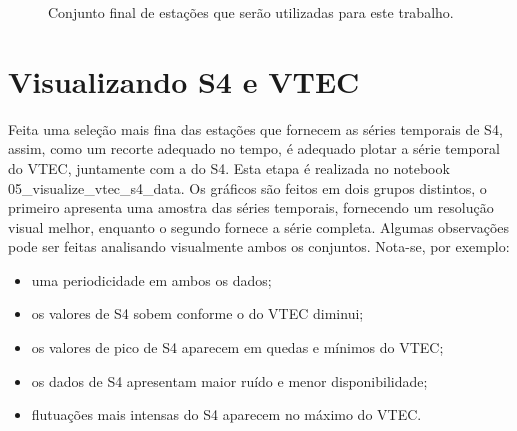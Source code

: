\begin{figure}[h]
\centering
\makebox[\textwidth][c]{}
\label{fig:mapstationsre}
\caption{Conjunto final de estações que serão utilizadas para este trabalho.}
\end{figure}

\section{Visualizando S4  e VTEC}\label{sec:viss4vtec}

Feita uma seleção mais fina das estações que fornecem as séries temporais de S4, assim, como um recorte adequado no tempo, é adequado plotar a série temporal do VTEC, juntamente com a do S4. Esta etapa é realizada no notebook 05\_visualize\_vtec\_s4\_data. Os gráficos são feitos em dois grupos distintos, o primeiro apresenta uma amostra das séries temporais, fornecendo um resolução visual melhor, enquanto o segundo fornece a série completa. Algumas observações pode ser feitas analisando visualmente ambos os conjuntos. Nota-se, por exemplo:

\begin{itemize}
\item uma periodicidade em ambos os dados; 
\item os valores de S4 sobem conforme o do VTEC diminui;
\item os valores de pico de S4 aparecem em quedas e mínimos do VTEC;
\item os dados de S4 apresentam maior ruído e menor disponibilidade;
\item flutuações mais intensas do S4 aparecem no máximo do VTEC.
\end{itemize}

